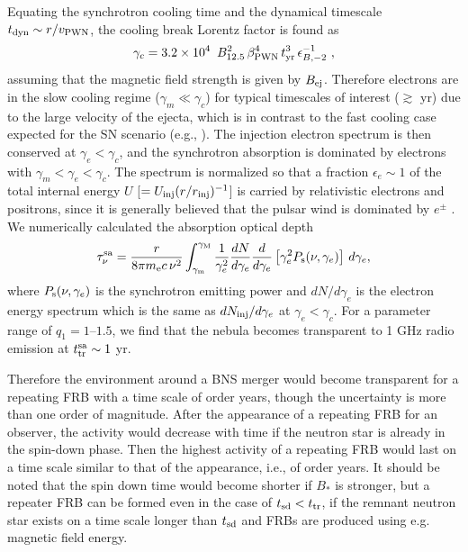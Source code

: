 \documentclass[]{pasj01}
\begin{document}
Equating the synchrotron cooling time and the dynamical timescale
  $t_{\rm dyn}\sim r/v_{\rm PWN}$, the cooling break Lorentz factor is
  found as
\begin{eqnarray}
    \gamma_{c}=3.2\times10^{4}\ \,B_{12.5}^{2}\,\beta_{\rm PWN}^{4}\,t_{\rm yr}^{3}\,\epsilon_{B,-2}^{-1} \ ,
\end{eqnarray}
assuming that the magnetic field strength is given by $B_{\rm ej}$.
Therefore electrons are in the slow cooling regime ($\gamma_m \ll
\gamma_c$) for typical timescales of interest ($\gtrsim$ yr) due to
the large velocity of the ejecta, which is in contrast to the fast
cooling case expected for the SN scenario (e.g.,
\cite{Kashiyama&Murase2017}).  The injection electron spectrum is then
conserved at $\gamma_e < \gamma_c$, and the synchrotron absorption is
dominated by electrons with $\gamma_m < \gamma_e < \gamma_c$.  The
spectrum is normalized so that a fraction $\epsilon_{e} \sim 1$ of the
total internal energy $U$ [$=U_{\rm inj}(r/r_{\rm inj})^{-1}$] is
carried by relativistic electrons and positrons, since it is generally
believed that the pulsar wind is dominated by $e^\pm$
\citep{Kennel&Coroniti1984,Tanaka2013}.  We numerically calculated the
absorption optical depth
\begin{eqnarray}
\label{eq. synchrotron tau}
    \tau_{\nu}^{\rm sa}=\frac{r}{8\pi m_{\rm e}c\, \nu^2}\int_{\gamma_{\rm m}}^{\gamma_{\rm M}}\frac{1}{\gamma_e^2}\frac{dN}{d\gamma_e}\frac{d}{d\gamma_e}\left[\gamma_e^2P_{\rm s}(\nu,\gamma_e)\right]\,d\gamma_e,
\end{eqnarray}
where $P_{\rm s}(\nu,\gamma_e)$ is the synchrotron emitting power and
$dN/d\gamma_e$ is the electron energy spectrum which is the same as
$dN_{\rm inj}/d\gamma_e$ at $\gamma_e < \gamma_c$.  For a parameter
range of $q_1=1$--$1.5$, we find that the nebula becomes transparent
to 1 GHz radio emission at $t_{\rm tr}^{\rm sa} \sim 1$ yr.  

Therefore the environment around a BNS merger would become transparent
for a repeating FRB with a time scale of order years, though the
uncertainty is more than one order of magnitude. After the appearance
of a repeating FRB for an observer, the activity would decrease with
time if the neutron star is already in the spin-down phase.  Then the
highest activity of a repeating FRB would last on a time scale similar
to that of the appearance, i.e., of order years.  It should be noted
that the spin down time would become shorter if $B_*$ is stronger, but
a repeater FRB can be formed even in the case of $t_{\rm sd} < t_{\rm
  tr}$, if the remnant neutron star exists on a time scale longer than
$t_{\rm sd}$ and FRBs are produced using e.g. magnetic field energy.
\end{document}
